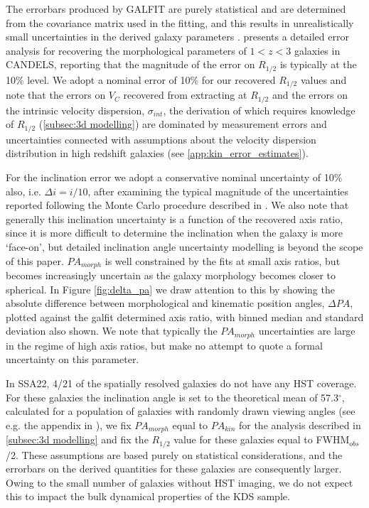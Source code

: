 \documentclass[fleqn,usenatbib]{mn2e}
\begin{document}
The errorbars produced by GALFIT are purely statistical and are determined from the covariance matrix used in the fitting, and this results in unrealistically small uncertainties in the derived galaxy parameters \citep{Hausler2007,Bruce2012}.
\cite{Bruce2012} presents a detailed error analysis for recovering the morphological parameters of $1 < z < 3$ galaxies in CANDELS, reporting that the magnitude of the error on $R_{1/2}$ is typically at the 10$\%$ level.
We adopt a nominal error of 10$\%$ for our recovered $R_{1/2}$ values and note that the errors on $V_{C}$ recovered from extracting at $R_{1/2}$ and the errors on the intrinsic velocity dispersion, $\sigma_{int}$, the derivation of which requires knowledge of $R_{1/2}$ (\cref{subsec:3d modelling}) are dominated by measurement errors and uncertainties connected with assumptions about the velocity dispersion distribution in high redshift galaxies (see \cref{app:kin_error_estimates}).

For the inclination error we adopt a conservative nominal uncertainty of 10$\%$ also, i.e. $\Delta i = i / 10$, after examining the typical magnitude of the uncertainties reported following the Monte Carlo procedure described in \cite{Epinat2012}.
We also note that generally this inclination uncertainty is a function of the recovered axis ratio, since it is more difficult to determine the inclination when the galaxy is more `face-on', but detailed inclination angle uncertainty modelling is beyond the scope of this paper.
$PA_{morph}$ is well constrained by the fits at small axis ratios, but becomes increasingly uncertain as the galaxy morphology becomes closer to spherical.
In Figure \ref{fig:delta_pa} we draw attention to this by showing the absolute difference between morphological and kinematic position angles, $\Delta PA$, plotted against the galfit determined axis ratio, with binned median and standard deviation also shown.
We note that typically the $PA_{morph}$ uncertainties are large in the regime of high axis ratios, but make no attempt to quote a formal uncertainty on this parameter.

In SSA22, 4/21 of the spatially resolved galaxies do not have any HST coverage.
For these galaxies the inclination angle is set to the theoretical mean of 57.3$^{\circ}$, calculated for a population of galaxies with randomly drawn viewing angles (see e.g. the appendix in \cite{Law2009}), we fix $PA_{morph}$ equal to $PA_{kin}$ for the analysis described in \cref{subsec:3d modelling} and fix the $R_{1/2}$ value for these galaxies equal to FWHM$_{obs}$/2.
These assumptions are based purely on statistical considerations, and the errorbars on the derived quantities for these galaxies are consequently larger.
Owing to the small number of galaxies without HST imaging, we do not expect this to impact the bulk dynamical properties of the KDS sample.
\end{document}
